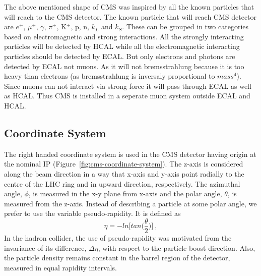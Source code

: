 The above mentioned shape of CMS was inspired by all the known particles that will reach to the CMS detector.
The known particle that will reach CMS detector are $e^{\pm}$, $\mu^{\pm}$, $\gamma$, $\pi^{\pm}$, K$^{\pm}$, p, n, $k_{L}$ and $k_{S}$.
These can be grouped in two categories based on electromagnetic and strong interactions.
All the strongly interacting particles will be detected by HCAL while all the electromagnetic interacting particles should be detected by ECAL.
But only electrons and photons are detected by ECAL not muons.
As it will not bremsstrahlung because it is too heavy than electrons (as bremsstrahlung is inversaly proportional to $mass^4$).
Since muons can not interact via strong force it will pass through ECAL as well as HCAL.
Thus CMS is installed in a seperate muon system outside ECAL and HCAL.

\subsection{Coordinate System} %
\label{sub:coordinate_system}
The right handed coordinate system is used in the CMS detector having origin at the nominal IP (Figure~\ref{fig:cms-coordinate-system}). The z-axis is considered along the beam direction in a way that x-axis and y-axis point radially to the centre of the LHC ring and in upward direction, respectively. The azimuthal angle, $\phi$, is measured in the x-y plane from x-axis and the polar angle, $\theta$, is measured from the z-axis. Instead of describing a particle at some polar angle, we prefer to use the variable pseudo-rapidity. It is defined as 
\begin{equation}
	\eta = -ln\bigg[tan\Big(\frac{\theta}{2}\Big)\bigg]~,
\end{equation}
In the hadron collider, the use of pseudo-rapidity was motivated from the invariance of its difference, $\Delta \eta$, with respect to the particle boost direction. Also, the particle density remains constant in the barrel region of the detector, measured in equal rapidity intervals.

